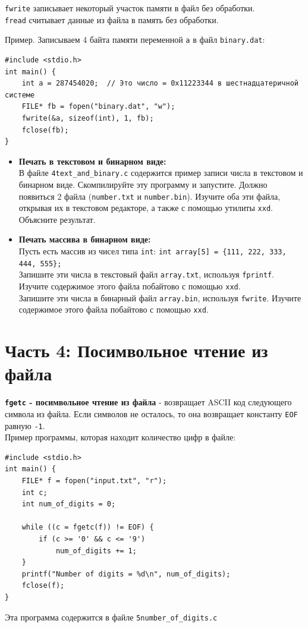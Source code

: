 \documentclass{article}
\begin{document}
\texttt{fwrite} записывает некоторый участок памяти в файл без обработки. \\
\texttt{fread} считывает данные из файла в память без обработки.

Пример. Записываем 4 байта памяти переменной \texttt{a} в файл \texttt{binary.dat}:
\begin{lstlisting}
#include <stdio.h>
int main() {
    int a = 287454020;  // Это число = 0x11223344 в шестнадцатеричной системе
    FILE* fb = fopen("binary.dat", "w");
    fwrite(&a, sizeof(int), 1, fb);
    fclose(fb);
}
\end{lstlisting}

\begin{itemize}
\item \textbf{Печать в текстовом и бинарном виде:}\\
В файле \texttt{4text\_and\_binary.c} содержится пример записи числа в текстовом и бинарном виде. Скомпилируйте эту программу и запустите. Должно появиться 2 файла (\texttt{number.txt} и \texttt{number.bin}). Изучите оба эти файла, открывая их в текстовом редакторе, а также с помощью утилиты \texttt{xxd}. Объясните результат.


\item \textbf{Печать массива в бинарном виде:}\\
Пусть есть массив из чисел типа \texttt{int}: \texttt{int array[5] = \{111, 222, 333, 444, 555\};}\\
Запишите эти числа в текстовый файл \texttt{array.txt}, используя \texttt{fprintf}. Изучите содержимое этого файла побайтово с помощью \texttt{xxd}.\\
Запишите эти числа в бинарный файл \texttt{array.bin}, используя \texttt{fwrite}. Изучите содержимое этого файла побайтово с помощью \texttt{xxd}.
\end{itemize}


\newpage
\section*{Часть 4: Посимвольное чтение из файла}

\textbf{\texttt{fgetc} - посимвольное чтение из файла} - возвращает ASCII код следующего символа из файла. Если символов не осталось, то она возвращает константу \texttt{EOF} равную \texttt{-1}.\\
Пример программы, которая находит количество цифр в файле:
\begin{lstlisting}
#include <stdio.h>
int main() {
    FILE* f = fopen("input.txt", "r");
    int c; 
    int num_of_digits = 0;

    while ((c = fgetc(f)) != EOF) {
        if (c >= '0' && c <= '9')
            num_of_digits += 1;
    }
    printf("Number of digits = %d\n", num_of_digits);
    fclose(f);
}
\end{lstlisting}
Эта программа содержится в файле \texttt{5number\_of\_digits.c}
\end{document}
